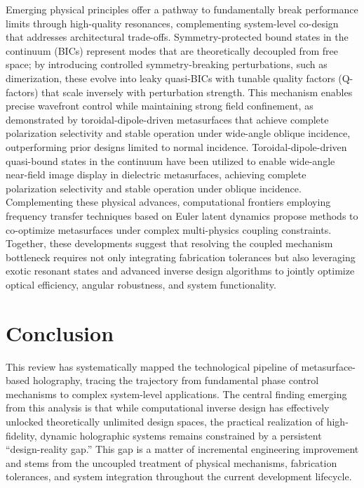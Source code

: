 \documentclass[11pt]{article}
\begin{document}
Emerging physical principles offer a pathway to fundamentally break performance limits through high-quality resonances, complementing system-level co-design that addresses architectural trade-offs. Symmetry-protected bound states in the continuum (BICs) represent modes that are theoretically decoupled from free space; by introducing controlled symmetry-breaking perturbations, such as dimerization, these evolve into leaky quasi-BICs with tunable quality factors (Q-factors) that scale inversely with perturbation strength. This mechanism enables precise wavefront control while maintaining strong field confinement, as demonstrated by toroidal-dipole-driven metasurfaces that achieve complete polarization selectivity and stable operation under wide-angle oblique incidence, outperforming prior designs limited to normal incidence. Toroidal-dipole-driven quasi-bound states in the continuum have been utilized to enable wide-angle near-field image display in dielectric metasurfaces, achieving complete polarization selectivity and stable operation under oblique incidence. \citep{s2_5a46bf1115a13c8e88d03d52a56e80871e3550cd_094f009d} Complementing these physical advances, computational frontiers employing frequency transfer techniques based on Euler latent dynamics propose methods to co-optimize metasurfaces under complex multi-physics coupling constraints. Together, these developments suggest that resolving the coupled mechanism bottleneck requires not only integrating fabrication tolerances but also leveraging exotic resonant states and advanced inverse design algorithms to jointly optimize optical efficiency, angular robustness, and system functionality. \citep{doi_10_1103_physrevapplied_21_044004_d1b93ffe} \citep{s2_5a46bf1115a13c8e88d03d52a56e80871e3550cd_094f009d} \citep{doi_10_1038_s41467_025_57516_z_7c69e056}

\section{Conclusion}\label{conclusion}

This review has systematically mapped the technological pipeline of metasurface-based holography, tracing the trajectory from fundamental phase control mechanisms to complex system-level applications. The central finding emerging from this analysis is that while computational inverse design has effectively unlocked theoretically unlimited design spaces, the practical realization of high-fidelity, dynamic holographic systems remains constrained by a persistent ``design-reality gap.'' This gap is a matter of incremental engineering improvement and stems from the uncoupled treatment of physical mechanisms, fabrication tolerances, and system integration throughout the current development lifecycle.
\end{document}

